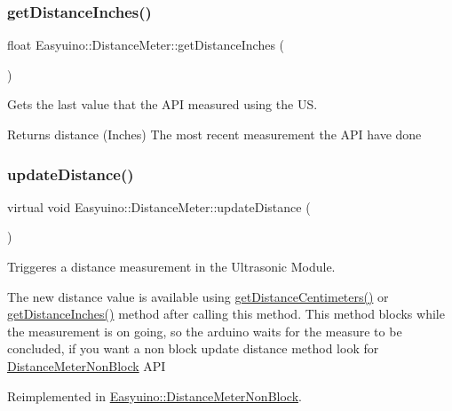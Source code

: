 \subsubsection{\texorpdfstring{get\+Distance\+Inches()}{getDistanceInches()}}
{\footnotesize\ttfamily float Easyuino\+::\+Distance\+Meter\+::get\+Distance\+Inches (\begin{DoxyParamCaption}{ }\end{DoxyParamCaption})}



Gets the last value that the A\+PI measured using the US. 

\begin{DoxyReturn}{Returns}
distance (Inches) The most recent measurement the A\+PI have done 
\end{DoxyReturn}
\mbox{\label{class_easyuino_1_1_distance_meter_a739197578f06b58faedefd0526d49499}} 
\subsubsection{\texorpdfstring{update\+Distance()}{updateDistance()}}
{\footnotesize\ttfamily virtual void Easyuino\+::\+Distance\+Meter\+::update\+Distance (\begin{DoxyParamCaption}{ }\end{DoxyParamCaption})\hspace{0.3cm}{\ttfamily [virtual]}}



Triggeres a distance measurement in the Ultrasonic Module. 

The new distance value is available using \hyperlink{class_easyuino_1_1_distance_meter_a637cdd0d3e4f3bcf094704ae91e0c7c3}{get\+Distance\+Centimeters()} or \hyperlink{class_easyuino_1_1_distance_meter_a4e3c650c54382d9af6bca51dcac4e7a3}{get\+Distance\+Inches()} method after calling this method.  This method blocks while the measurement is on going, so the arduino waits for the measure to be concluded, if you want a non block update distance method look for \hyperlink{class_easyuino_1_1_distance_meter_non_block}{Distance\+Meter\+Non\+Block} A\+PI 

Reimplemented in \hyperlink{class_easyuino_1_1_distance_meter_non_block_a4ea37c6c0562a76cd03636db329743f9}{Easyuino\+::\+Distance\+Meter\+Non\+Block}.



